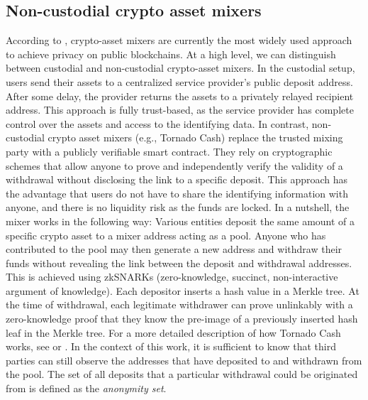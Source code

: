 \documentclass[12pt,a4paper,titlepage,oneside,english]{article}
\begin{document}
\subsection{Non-custodial crypto asset mixers}
According to \cite{nadler2023tornado}, crypto-asset mixers are currently the most widely used approach to achieve privacy on public blockchains. At a high level, we can distinguish between custodial and non-custodial crypto-asset mixers. \newline
In the custodial setup, users send their assets to a centralized service provider's public deposit address. After some delay, the provider returns the assets to a privately relayed recipient address. This approach is fully trust-based, as the service provider has complete control over the assets and access to the identifying data. \citep{nadler2023tornado} \newline 
In contrast, non-custodial crypto asset mixers (e.g., Tornado Cash) replace the trusted mixing party with a publicly verifiable smart contract. They rely on cryptographic schemes that allow anyone to prove and independently verify the validity of a withdrawal without disclosing the link to a specific deposit. This approach has the advantage that users do not have to share the identifying information with anyone, and there is no liquidity risk as the funds are locked. \citep{nadler2023tornado} \newline
In a nutshell, the mixer works in the following way: Various entities deposit the same amount of a specific crypto asset to a mixer address acting as a pool. Anyone who has contributed to the pool may then generate a new address and withdraw their funds without revealing the link between the deposit and withdrawal addresses. This is achieved using zkSNARKs (zero-knowledge, succinct, non-interactive argument of knowledge). 
Each depositor inserts a hash value in a Merkle tree. At the time of withdrawal, each legitimate withdrawer can prove unlinkably with a zero-knowledge proof that they know the pre-image of a previously inserted hash leaf in the Merkle tree. %
 For a more detailed description of how Tornado Cash works, see \cite{nadler2023tornado} or \cite{Beres2020}. \newline
In the context of this work, it is sufficient to know that third parties can still observe the addresses that have deposited to and withdrawn from the pool. The set of all deposits that a particular withdrawal could be originated from is defined as the \textit{anonymity set}. 
\end{document}
